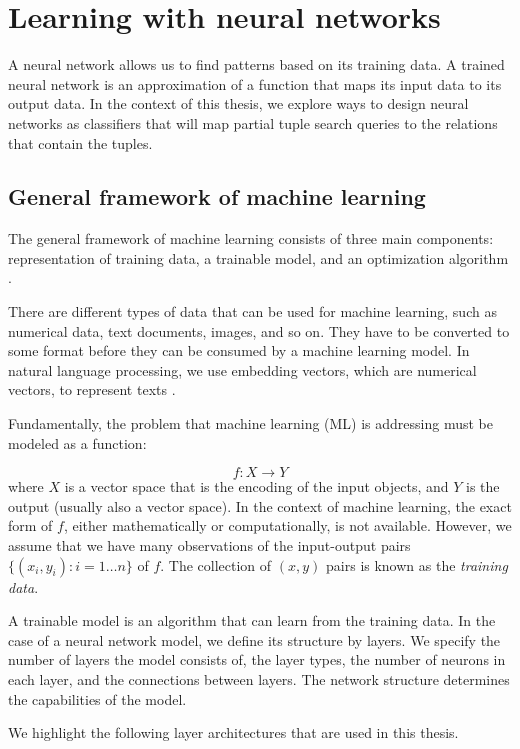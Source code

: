 \section{Learning with neural networks}
\label{sec:neural-networks}
A neural network allows us to find patterns based on its training data. A trained neural network is an approximation of a function that maps its input data to its output data. In the context of this thesis, we explore ways to design neural networks as classifiers that will map partial tuple search queries to the relations that contain the tuples.


\subsection{General framework of machine learning}

The general framework of machine learning consists of three main components: representation of training data, a trainable model, and an optimization algorithm \cite{lecun2015deep,bengio2017deep}.

There are different types of data that can be used for machine learning, such as numerical data, text documents, images, and so on. They have to be converted to some format before they can be consumed by a machine learning model. In natural language processing, we use embedding vectors, which are numerical vectors, to represent texts \cite{li2018word,tripathy2021comprehensive}.

Fundamentally, the problem that machine learning (ML) is addressing must be modeled as a function:

$$
f : X \to Y
$$
where $X$ is a vector space that is the encoding of the input objects, and $Y$ is the output (usually also a vector space).  In the context of machine learning, the exact form of $f$, either mathematically or computationally, is not available.  However, we assume that we have many observations of the input-output pairs $\{(x_i, y_i): i=1\dots n\}$ of $f$.  The collection of $(x,y)$ pairs is known as the {\em training data}.

A trainable model is an algorithm that can learn from the training data. In the case of a neural network model, we define its structure by layers. We specify the number of layers the model consists of, the layer types, the number of neurons in each layer, and the connections between layers. The network structure determines the capabilities of the model.

We highlight the following  layer architectures that are used in this thesis.


